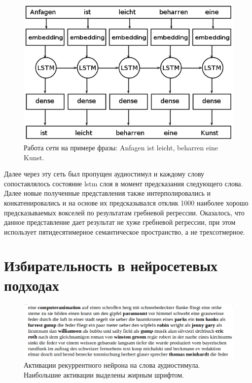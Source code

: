 \documentclass[pdftex,ptm,12pt,a4paper]{report}
\theoremstyle{definition}
\begin{document}
\begin{figure}
\centering
\includegraphics[scale=0.5]{images/lstm-architecture.png}
\caption{Работа сети на примере фразы: Anfagen ist leicht, beharren eine Kunst.}
\label{lstm_architecture}
\end{figure}

Далее через эту сеть был пропущен аудиостимул и каждому слову сопоставлялось состояние lstm слоя в момент предсказания следующего слова. Далее новые полученные представления также интерполировались и конкатенировались и на основе их предсказывался отклик 1000 наиболее хорошо предсказываемых вокселей по результатам гребневой регрессии.
Оказалось, что данное представление дает результат не хуже гребневой регрессии, при этом использует пятидесятимерное семантическое  пространство, а не трехсотмерное.

\section{Избирательность в нейросетевых подходах}
\begin{figure}
\includegraphics[scale=0.5]{images/text_crop_wb.png}
\caption{Активации рекуррентного нейрона на слова аудиостимула. Наибольшие активации выделены жирным шрифтом.}
\label{lstm_activation}
\end{figure}
\end{document}
